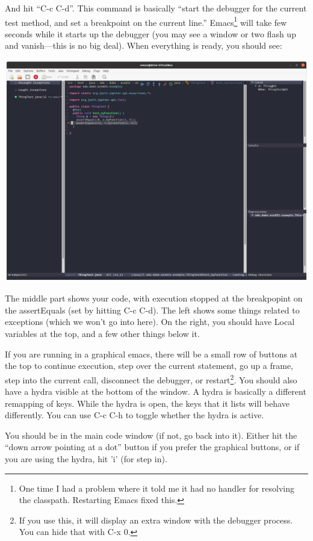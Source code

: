 \documentclass[12pt]{article}
\begin{document}
And hit ``C-c C-d''. This command is basically ``start the debugger
for the current test method, and set a breakpoint on the current
line.''  Emacs\footnote{One time I had a problem where it told me it
had no handler for resolving the classpath. Restarting Emacs fixed
this.} will take few seconds while it starts up the debugger (you may
see a window or two flash up and vanish---this is no big deal).  When
everything is ready, you should see:


\begin{center}
  \includegraphics[width=5.5in]{emacs-debug1.png}
\end{center}

The middle part shows your code, with execution stopped at the breakpopint on the assertEquals (set
by hitting C-c C-d).  The left shows some things related to exceptions (which we won't go into here).
On the right, you should have Local variables at the top, and a few other things below it.

If you are running in a graphical emacs, there will be a small row of
buttons at the top to continue execution, step over the current
statement, go up a frame, step into the current call, disconnect the
debugger, or restart\footnote{If you use this, it will display an
extra window with the debugger process.  You can hide that with C-x
0.}.  You should also have a hydra visible at the bottom of the
window.   A hydra is basically a different remapping of keys.  While the
hydra is open, the keys that it lists will behave differently.  You can use
C-c C-h to toggle whether the hydra is active.  

You should be in the main code window (if not, go back into it).  Either hit
the ``down arrow pointing at a dot'' button if you prefer the graphical buttons, or
if you are using the hydra, hit 'i' (for step in).
\end{document}
